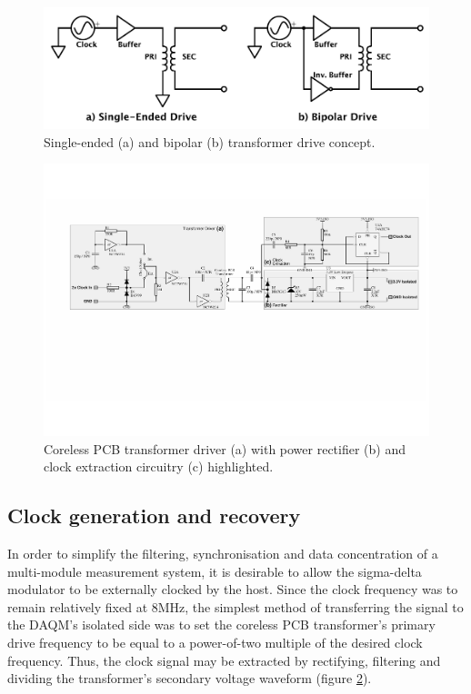 \documentclass[conference]{IEEEtran}
\begin{document}
	\begin{figure}[t]
		\centering
		\includegraphics[width=0.9\columnwidth]{./img/BIvsSE}
		\caption{Single-ended (a) and bipolar (b) transformer drive concept.}
		\label{fig:BIvsSE}
	\end{figure}
%	
	\begin{figure}[t]
		\centering
		\includegraphics[width=1.0\textwidth]{./img/TFpwrclk_BW}
		\caption{Coreless PCB transformer driver (a) with power rectifier (b) and clock extraction circuitry (c) highlighted.}
		\label{fig:TFpwrclk}
	\end{figure}	
	
	\subsection{Clock generation and recovery}
	In order to simplify the filtering, synchronisation and data concentration of a multi-module measurement system, it is desirable to allow the sigma-delta modulator to be externally clocked by the host.  Since the clock frequency was to remain relatively fixed at 8MHz, the simplest method of transferring the signal to the DAQM's isolated side was to set the coreless PCB transformer's primary drive frequency to be equal to a power-of-two multiple of the desired clock frequency.  Thus, the clock signal may be extracted by rectifying, filtering and dividing the transformer's secondary voltage waveform (figure \ref{fig:TFpwrclk}).
	
\end{document}

